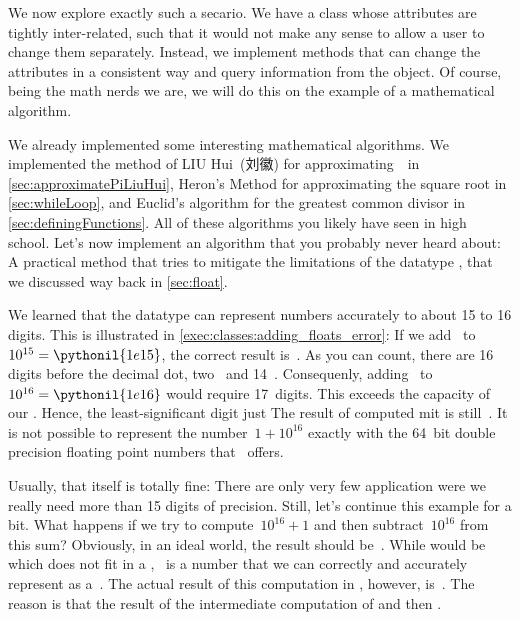 We now explore exactly such a secario.
We have a class whose attributes are tightly inter-related, such that it would not make any sense to allow a user to change them separately.
Instead, we implement methods that can change the attributes in a consistent way and query information from the object.
Of course, being the math nerds we are, we will do this on the example of a mathematical algorithm.

We already implemented some interesting mathematical algorithms.
We implemented the method of LIU Hui~(刘徽) for approximating~\numberPi\ in \cref{sec:approximatePiLiuHui}, Heron's Method for approximating the square root in \cref{sec:whileLoop}, and Euclid's algorithm for the greatest common divisor in \cref{sec:definingFunctions}.
All of these algorithms you likely have seen in high school.
Let's now implement an algorithm that you probably never heard about:
A practical method that tries to mitigate the limitations of the datatype , that we discussed way back in \cref{sec:float}.

We learned that the datatype  can represent numbers accurately to about 15 to 16 digits.
This is illustrated in \cref{exec:classes:adding_floats_error}:
If we add~ to~$10^{15}=\pythonil{1e15}$, the correct result is~.
As you can count, there are 16 digits before the decimal dot, two~ and 14~.
Consequenly, adding~ to~$10^{16}=\pythonil{1e16}$ would require 17~digits.
This exceeds the capacity of our .
Hence, the least-significant digit just 
The result of  computed mit  is still~.
It is not possible to represent the number~$1+10^{16}$ exactly with the 64~bit double precision floating point numbers that \python\ offers.

Usually, that itself is totally fine:
There are only very few application were we really need more than 15 digits of precision.
Still, let's continue this example for a bit.
What happens if we try to compute~$10^{16}+1$ and then subtract~$10^{16}$ from this sum?
Obviously, in an ideal world, the result should be~.
While  would be  which does not fit in a , ~is a number that we can correctly and accurately represent as a~.
The actual result of this computation in \python, however, is~.
The reason is that the result of the intermediate computation of  and then .

